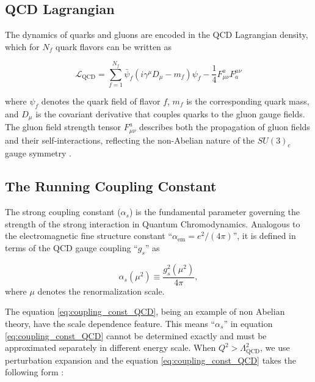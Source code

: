 \subsection{QCD Lagrangian}

The dynamics of quarks and gluons are encoded in the \ac{QCD} Lagrangian density, which for \(N_f\) quark flavors can be written as \cite{lancaster2014qft, ellis1996qcd, peskin_QFT}

\begin{equation}
\mathcal{L}_{\text{QCD}} = \sum_{f=1}^{N_f} \bar{\psi}_f \left( i \gamma^\mu D_\mu - m_f \right) \psi_f - \frac{1}{4} F_{\mu\nu}^a F^{\mu\nu}_a
\label{eq:QCD_lagrangian}
\end{equation}

where \(\psi_f\) denotes the quark field of flavor \(f\), \(m_f\) is the corresponding quark mass, and \(D_\mu\) is the covariant derivative that couples quarks to the gluon gauge fields. The gluon field strength tensor \(F_{\mu\nu}^a\) describes both the propagation of gluon fields and their self-interactions, reflecting the non-Abelian nature of the \(SU(3)_c\) gauge symmetry \cite{lancaster2014qft, ellis1996qcd, peskin_QFT}.




\subsection{The Running Coupling Constant}

The strong coupling constant ($\alpha_s$) is the fundamental parameter governing the strength of the strong interaction in Quantum Chromodynamics. Analogous to the electromagnetic fine structure constant ``$\alpha_{\mathrm{em}} = e^2/(4\pi)$'', it is defined in terms of the \ac{QCD} gauge coupling ``$g_s$'' as \cite{deur2016qcd}

\begin{equation}
\alpha_s(\mu^2) \equiv \frac{g_s^2(\mu^2)}{4\pi},
\label{eq:coupling_const_QCD}
\end{equation}
where $\mu$ denotes the renormalization scale.


The equation \ref{eq:coupling_const_QCD}, being an example of non Abelian theory, have the scale dependence feature. This means ``$\alpha_s$'' in equation \ref{eq:coupling_const_QCD} cannot be determined exactly and must be approximated separately in different energy scale. When $Q^2 > \Lambda_{\mathrm{QCD}}^2$, we use perturbation expansion and the equation \ref{eq:coupling_const_QCD} takes the following form \cite{deur2016qcd}:


